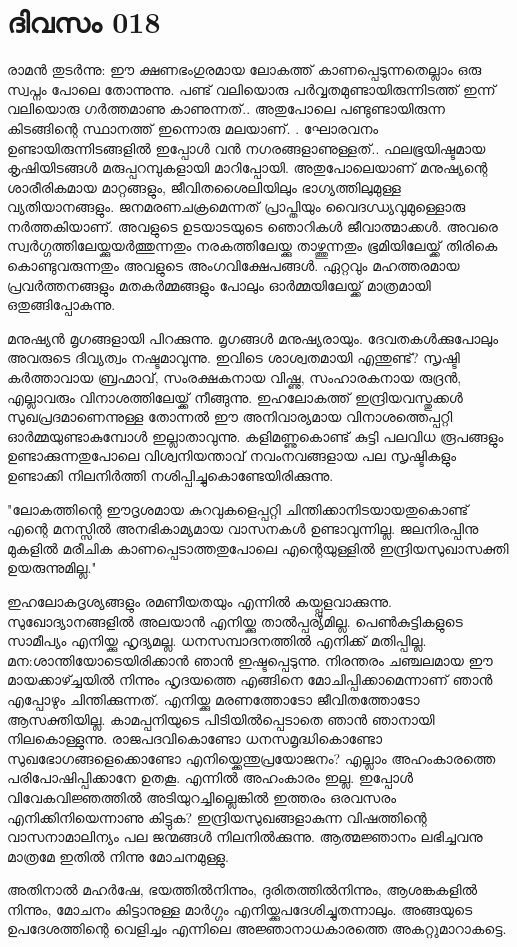  
\section{ദിവസം 018}


രാമന്‍ തുടര്‍ന്നു: ഈ ക്ഷണഭംഗുരമായ ലോകത്ത്‌ കാണപ്പെടുന്നതെല്ലാം ഒരു സ്വപ്നം പോലെ തോന്നുന്നു. പണ്ട്‌ വലിയൊരു പര്‍വ്വതമുണ്ടായിരുന്നിടത്ത്‌ ഇന്ന് വലിയൊരു ഗര്‍ത്തമാണു കാണുന്നത്‌.. അതുപോലെ പണ്ടുണ്ടായിരുന്ന കിടങ്ങിന്റെ സ്ഥാനത്ത്‌ ഇന്നൊരു മലയാണ്‌. . ഘോരവനം ഉണ്ടായിരുന്നിടങ്ങളില്‍ ഇപ്പോള്‍ വന്‍ നഗരങ്ങളാണുള്ളത്‌.. ഫലഭൂയിഷ്ടമായ കൃഷിയിടങ്ങള്‍ മരുപ്പറമ്പുകളായി മാറിപ്പോയി. അതുപോലെയാണ്‌ മനുഷ്യന്റെ ശാരീരികമായ മാറ്റങ്ങളും, ജീവിതശൈലിയിലും ഭാഗ്യത്തിലുമുള്ള വ്യതിയാനങ്ങളും. ജനമരണചക്രമെന്നത്‌ പ്രാപ്തിയും വൈദഗ്ധ്യവുമുള്ളൊരു നര്‍ത്തകിയാണ്‌. അവളുടെ ഉടയാടയുടെ ഞൊറികള്‍ ജീവാത്മാക്കള്‍. അവരെ സ്വര്‍ഗ്ഗത്തിലേയ്ക്കുയര്‍ത്തുന്നതും നരകത്തിലേയ്ക്കു താഴ്ത്തുന്നതും ഭൂമിയിലേയ്ക്ക്‌ തിരികെ കൊണ്ടുവരുന്നതും അവളുടെ അംഗവിക്ഷേപങ്ങള്‍. ഏറ്റവും മഹത്തരമായ പ്രവര്‍ത്തനങ്ങളും മതകര്‍മ്മങ്ങളും പോലും ഓര്‍മ്മയിലേയ്ക്ക്‌ മാത്രമായി ഒതുങ്ങിപ്പോകുന്നു.

മനുഷ്യന്‍ മൃഗങ്ങളായി പിറക്കുന്നു. മൃഗങ്ങള്‍ മനുഷ്യരായും. ദേവതകള്‍ക്കുപോലും അവരുടെ ദിവ്യത്വം നഷ്ടമാവുന്നു. ഇവിടെ ശാശ്വതമായി എന്തുണ്ട്‌? സൃഷ്ടി കര്‍ത്താവായ ബ്രഹ്മാവ്‌, സംരക്ഷകനായ വിഷ്ണു, സംഹാരകനായ രുദ്രന്‍, എല്ലാവരും വിനാശത്തിലേയ്ക്ക്‌ നീങ്ങുന്നു. ഇഹലോകത്ത്‌ ഇന്ദ്രിയവസ്തുക്കള്‍ സുഖപ്രദമാണെന്നുള്ള തോന്നല്‍ ഈ അനിവാര്യമായ വിനാശത്തെപ്പറ്റി ഓര്‍മ്മയുണ്ടാകുമ്പോള്‍ ഇല്ലാതാവുന്നു. കളിമണ്ണുകൊണ്ട്‌ കുട്ടി പലവിധ രൂപങ്ങളും ഉണ്ടാക്കുന്നതുപോലെ വിശ്വനിയന്താവ്‌ നവംനവങ്ങളായ പല സൃഷ്ടികളും ഉണ്ടാക്കി നിലനിര്‍ത്തി നശിപ്പിച്ചുകൊണ്ടേയിരിക്കുന്നു.

"ലോകത്തിന്റെ ഈദൃശമായ കുറവുകളെപ്പറ്റി ചിന്തിക്കാനിടയായതുകൊണ്ട്‌ എന്റെ മനസ്സില്‍ അനഭികാമ്യമായ വാസനകള്‍ ഉണ്ടാവുന്നില്ല. ജലനിരപ്പിനു മുകളില്‍ മരീചിക കാണപ്പെടാത്തതുപോലെ എന്റെയുള്ളില്‍ ഇന്ദ്രിയസുഖാസക്തി ഉയരുന്നുമില്ല."

ഇഹലോകദൃശ്യങ്ങളും രമണീയതയും എന്നില്‍ കയ്പ്പുളവാക്കുന്നു. സുഖോദ്യാനങ്ങളില്‍ അലയാന്‍ എനിയ്ക്കു താല്‍പ്പര്യമില്ല. പെണ്‍കുട്ടികളുടെ സാമീപ്യം എനിയ്ക്കു ഹൃദ്യമല്ല. ധനസമ്പാദനത്തില്‍ എനിക്ക്‌ മതിപ്പില്ല. മന:ശാന്തിയോടെയിരിക്കാന്‍ ഞാന്‍ ഇഷ്ടപ്പെടുന്നു. നിരന്തരം ചഞ്ചലമായ ഈ മായക്കാഴ്ച്ചയില്‍ നിന്നും ഹൃദയത്തെ എങ്ങിനെ മോചിപ്പിക്കാമെന്നാണ്‌ ഞാന്‍ എപ്പോഴും ചിന്തിക്കുന്നത്‌. എനിയ്ക്കു മരണത്തോടോ ജീവിതത്തോടോ ആസക്തിയില്ല. കാമപ്പനിയുടെ പിടിയില്‍പ്പെടാതെ ഞാന്‍ ഞാനായി നിലകൊള്ളുന്നു. രാജപദവികൊണ്ടോ ധനസമൃദ്ധികൊണ്ടോ സുഖഭോഗങ്ങളെക്കൊണ്ടോ എനിയ്ക്കെന്തുപ്രയോജനം? എല്ലാം അഹംകാരത്തെ പരിപോഷിപ്പിക്കാനേ ഉതകൂ. എന്നില്‍ അഹംകാരം ഇല്ല. ഇപ്പോള്‍ വിവേകവിജ്ഞത്തില്‍ അടിയുറച്ചില്ലെങ്കില്‍ ഇത്തരം ഒരവസരം എനിക്കിനിയെന്നാണു കിട്ടുക? ഇന്ദ്രിയസുഖങ്ങളാകുന്ന വിഷത്തിന്റെ വാസനാമാലിന്യം പല ജന്മങ്ങള്‍ നിലനില്‍ക്കുന്നു.   ആത്മജ്ഞാനം ലഭിച്ചവനു മാത്രമേ ഇതില്‍ നിന്നു മോചനമുള്ളു. 

അതിനാല്‍ മഹര്‍ഷേ, ഭയത്തില്‍നിന്നും, ദുരിതത്തില്‍നിന്നും, ആശങ്കകളില്‍ നിന്നും, മോചനം കിട്ടാനുള്ള മാര്‍ഗ്ഗം എനിയ്ക്കുപദേശിച്ചുതന്നാലും. അങ്ങയുടെ ഉപദേശത്തിന്റെ വെളിച്ചം എന്നിലെ അജ്ഞാനാധകാരത്തെ അകറ്റുമാറാകട്ടെ.

